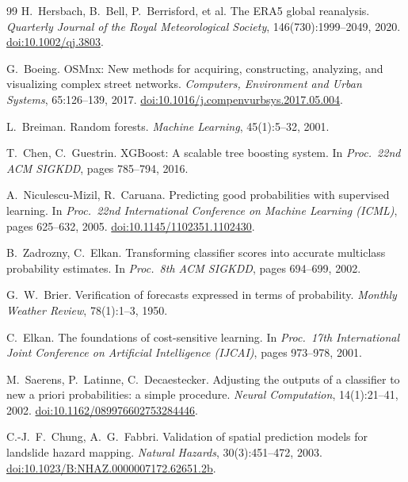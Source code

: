 \documentclass[journal]{IEEEtran}
\begin{document}
\begin{thebibliography}{99}
H.~Hersbach, B.~Bell, P.~Berrisford, et al.
The ERA5 global reanalysis.
\emph{Quarterly Journal of the Royal Meteorological Society}, 146(730):1999--2049, 2020.
\href{https://doi.org/10.1002/qj.3803}{doi:10.1002/qj.3803}.

G.~Boeing.
OSMnx: New methods for acquiring, constructing, analyzing, and visualizing
complex street networks.
\emph{Computers, Environment and Urban Systems}, 65:126--139, 2017.
\href{https://doi.org/10.1016/j.compenvurbsys.2017.05.004}{doi:10.1016/j.compenvurbsys.2017.05.004}.

L.~Breiman. Random forests. \emph{Machine Learning}, 45(1):5--32, 2001.

T.~Chen, C.~Guestrin.
XGBoost: A scalable tree boosting system.
In \emph{Proc.\ 22nd ACM SIGKDD}, pages 785--794, 2016.

A.~Niculescu-Mizil, R.~Caruana.
Predicting good probabilities with supervised learning.
In \emph{Proc.\ 22nd International Conference on Machine Learning (ICML)},
pages 625--632, 2005.
\href{https://doi.org/10.1145/1102351.1102430}{doi:10.1145/1102351.1102430}.

B.~Zadrozny, C.~Elkan.
Transforming classifier scores into accurate multiclass probability estimates.
In \emph{Proc.\ 8th ACM SIGKDD}, pages 694--699, 2002.

G.~W.~Brier.
Verification of forecasts expressed in terms of probability.
\emph{Monthly Weather Review}, 78(1):1--3, 1950.

C.~Elkan.
The foundations of cost-sensitive learning.
In \emph{Proc.\ 17th International Joint Conference on Artificial Intelligence
(IJCAI)}, pages 973--978, 2001.

M.~Saerens, P.~Latinne, C.~Decaestecker.
Adjusting the outputs of a classifier to new a priori probabilities: a simple
procedure.
\emph{Neural Computation}, 14(1):21--41, 2002.
\href{https://doi.org/10.1162/089976602753284446}{doi:10.1162/089976602753284446}.

C.-J.~F.~Chung, A.~G.~Fabbri.
Validation of spatial prediction models for landslide hazard mapping.
\emph{Natural Hazards}, 30(3):451--472, 2003.
\href{https://doi.org/10.1023/B:NHAZ.0000007172.62651.2b}{doi:10.1023/B:NHAZ.0000007172.62651.2b}.


\end{thebibliography}
\end{document}
